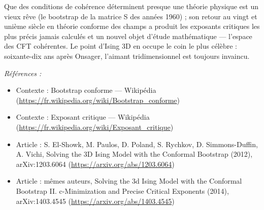 \documentclass[11pt]{article}
\newenvironment{refs}{\par\small\noindent\emph{Références :}\begin{itemize}\setlength\itemsep{0pt}}{\end{itemize}\normalsize}
\begin{document}
\noindent Que des conditions de cohérence déterminent presque une théorie physique est un
vieux rêve (le bootstrap de la matrice S des années 1960) ; son retour au vingt et unième siècle
en théorie conforme des champs a produit les exposants critiques les plus précis jamais calculés
et un nouvel objet d'étude mathématique --- l'espace des CFT cohérentes. Le point d'Ising 3D en
occupe le coin le plus célèbre : soixante-dix ans après Onsager, l'aimant tridimensionnel est
toujours invaincu.

\begin{refs}
\item Contexte : Bootstrap conforme --- Wikipédia (\url{https://fr.wikipedia.org/wiki/Bootstrap_conforme})
\item Contexte : Exposant critique --- Wikipédia (\url{https://fr.wikipedia.org/wiki/Exposant_critique})
\item Article : S. El-Showk, M. Paulos, D. Poland, S. Rychkov, D. Simmons-Duffin, A. Vichi, \og{} Solving the 3D Ising Model with the Conformal Bootstrap \fg{} (2012), arXiv:1203.6064 (\url{https://arxiv.org/abs/1203.6064})
\item Article : mêmes auteurs, \og{} Solving the 3d Ising Model with the Conformal Bootstrap II. c-Minimization and Precise Critical Exponents \fg{} (2014), arXiv:1403.4545 (\url{https://arxiv.org/abs/1403.4545})
\end{refs}

\bigskip
\end{document}
